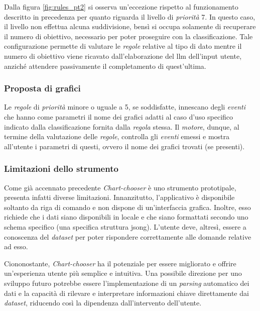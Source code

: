 Dalla figura \ref{fig:rules_pt2} si osserva un'eccezione rispetto al funzionamento descritto in precedenza per quanto riguarda il livello di \emph{priorità} 7. In questo caso, il livello non effettua alcuna suddivisione, 
bensì si occupa solamente di recuperare il numero di obiettivo, necessario per poter proseguire con la classificazione. Tale configurazione permette di valutare le \emph{regole} relative al tipo di dato mentre  
il numero di obiettivo viene ricavato dall'elaborazione del \gls{llm} dell'input utente, anziché attendere passivamente il completamento di quest'ultima.


\subsubsection{Proposta di grafici}
Le \emph{regole} di \emph{priorità} minore o uguale a 5, se soddisfatte, innescano degli \emph{eventi} che hanno come parametri il nome dei grafici adatti al caso d'uso specifico indicato dalla classificazione fornita dalla \emph{regola} stessa. 
Il \emph{motore}, dunque, al termine della valutazione delle \emph {regole}, controlla gli \emph{eventi} emessi e mostra all'utente i parametri di questi, ovvero il nome dei grafici trovati (se presenti).



\subsubsection{Limitazioni dello strumento}
Come già accennato precedente \emph{Chart-chooser} è uno strumento prototipale, presenta infatti diverse limitazioni.
Innanzitutto, l'applicativo è disponibile soltanto da riga di comando e non dispone di un'interfaccia grafica.
Inoltre, esso richiede che i dati siano disponibili in locale e che siano formattati secondo uno schema specifico
(una specifica struttura \gls{jsong}). 
L'utente deve, altresì, essere a conoscenza del \emph{dataset} per poter rispondere correttamente alle domande relative ad esso.

Ciononostante, \emph{Chart-chooser} ha il potenziale per essere migliorato e offrire un'esperienza utente più semplice e intuitiva. 
Una possibile direzione per uno sviluppo futuro potrebbe essere l'implementazione di un \emph{parsing} automatico dei dati e la capacità di 
rilevare e interpretare informazioni chiave direttamente dai \emph{dataset}, riducendo così la dipendenza dall'intervento dell'utente. 